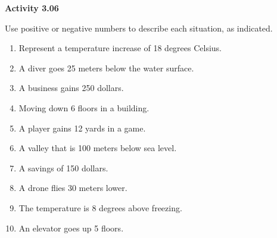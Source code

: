 \vspace{0.3ex}
\noindent\textbf{Activity 3.06}

\vspace{0.2ex}

Use positive or negative numbers to describe each situation, as indicated.

\begin{enumerate}[label=\color{blue}\arabic*.]
    \item Represent a temperature increase of 18 degrees Celsius.
    \item A diver goes 25 meters below the water surface.
    \item A business gains 250 dollars.
    \item Moving down 6 floors in a building.
    \item A player gains 12 yards in a game.
    \item A valley that is 100 meters below sea level.
    \item A savings of 150 dollars.
    \item A drone flies 30 meters lower.
    \item The temperature is 8 degrees above freezing.
    \item An elevator goes up 5 floors.
\end{enumerate}

